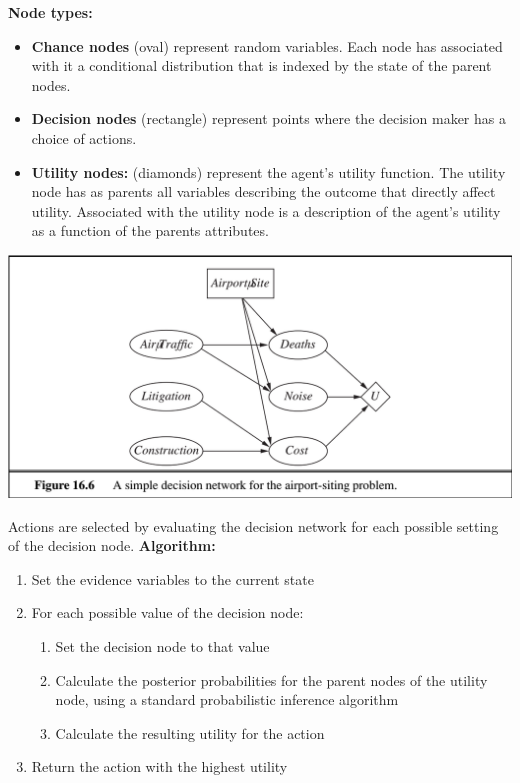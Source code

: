 \documentclass{scrartcl}
\begin{document}
\textbf{Node types:}
\begin{itemize}
    \item
        \textbf{Chance nodes} (oval) represent random variables. Each node has associated with it a conditional distribution that is indexed by the state of the parent nodes.
    \item
        \textbf{Decision nodes} (rectangle) represent points where the decision maker has a choice of actions.
    \item
        \textbf{Utility nodes:} (diamonds) represent the agent's utility function. The utility node has as parents all variables describing the outcome that directly affect utility. Associated with the utility node is a description of the agent's utility as a function of the parents attributes.
\end{itemize}

\begin{center}
    \includegraphics[scale=0.4]{img/airport.png}
\end{center}

Actions are selected by evaluating the decision network for each possible setting of the decision node. 
\textbf{Algorithm:}
\begin{enumerate}
    \item
        Set the evidence variables to the current state
    \item
        For each possible value of the decision node:
        \begin{enumerate}
            \item
                Set the decision node to that value
            \item
                Calculate the posterior probabilities for the parent nodes of the utility node, using a standard probabilistic inference algorithm
            \item
                Calculate the resulting utility for the action
        \end{enumerate}
    \item
        Return the action with the highest utility
\end{enumerate}
\end{document}
